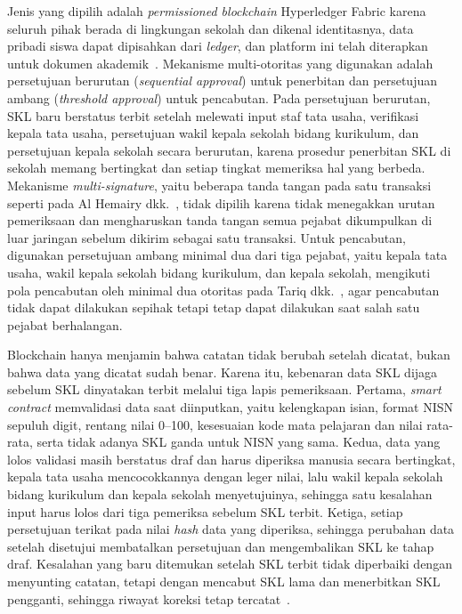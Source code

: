 Jenis yang dipilih adalah \textit{permissioned blockchain} Hyperledger Fabric karena seluruh pihak berada di lingkungan sekolah dan dikenal identitasnya, data pribadi siswa dapat dipisahkan dari \textit{ledger}, dan platform ini telah diterapkan untuk dokumen akademik~\cite{Blanco2025Digital,Dash2025Hyperledger}. Mekanisme multi-otoritas yang digunakan adalah persetujuan berurutan (\textit{sequential approval}) untuk penerbitan dan persetujuan ambang (\textit{threshold approval}) untuk pencabutan. Pada persetujuan berurutan, SKL baru berstatus terbit setelah melewati input staf tata usaha, verifikasi kepala tata usaha, persetujuan wakil kepala sekolah bidang kurikulum, dan persetujuan kepala sekolah secara berurutan, karena prosedur penerbitan SKL di sekolah memang bertingkat dan setiap tingkat memeriksa hal yang berbeda. Mekanisme \textit{multi-signature}, yaitu beberapa tanda tangan pada satu transaksi seperti pada Al Hemairy dkk.~\cite{AlHemairy2024UAE}, tidak dipilih karena tidak menegakkan urutan pemeriksaan dan mengharuskan tanda tangan semua pejabat dikumpulkan di luar jaringan sebelum dikirim sebagai satu transaksi. Untuk pencabutan, digunakan persetujuan ambang minimal dua dari tiga pejabat, yaitu kepala tata usaha, wakil kepala sekolah bidang kurikulum, dan kepala sekolah, mengikuti pola pencabutan oleh minimal dua otoritas pada Tariq dkk.~\cite{Tariq2023Cerberus}, agar pencabutan tidak dapat dilakukan sepihak tetapi tetap dapat dilakukan saat salah satu pejabat berhalangan.

Blockchain hanya menjamin bahwa catatan tidak berubah setelah dicatat, bukan bahwa data yang dicatat sudah benar. Karena itu, kebenaran data SKL dijaga sebelum SKL dinyatakan terbit melalui tiga lapis pemeriksaan. Pertama, \textit{smart contract} memvalidasi data saat diinputkan, yaitu kelengkapan isian, format NISN sepuluh digit, rentang nilai 0--100, kesesuaian kode mata pelajaran dan nilai rata-rata, serta tidak adanya SKL ganda untuk NISN yang sama. Kedua, data yang lolos validasi masih berstatus draf dan harus diperiksa manusia secara bertingkat, kepala tata usaha mencocokkannya dengan leger nilai, lalu wakil kepala sekolah bidang kurikulum dan kepala sekolah menyetujuinya, sehingga satu kesalahan input harus lolos dari tiga pemeriksa sebelum SKL terbit. Ketiga, setiap persetujuan terikat pada nilai \textit{hash} data yang diperiksa, sehingga perubahan data setelah disetujui membatalkan persetujuan dan mengembalikan SKL ke tahap draf. Kesalahan yang baru ditemukan setelah SKL terbit tidak diperbaiki dengan menyunting catatan, tetapi dengan mencabut SKL lama dan menerbitkan SKL pengganti, sehingga riwayat koreksi tetap tercatat~\cite{Hafis2026Insider}.

